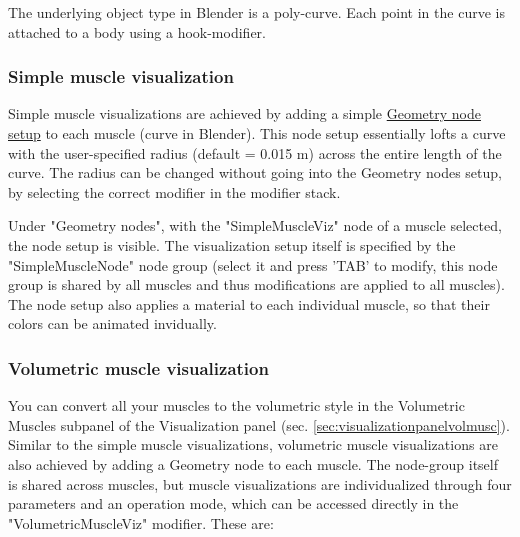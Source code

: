 \documentclass{article}
\begin{document}
The underlying object type in Blender is a poly-curve. Each point in the curve is attached to a body using a hook-modifier.

\subsubsection{Simple muscle visualization}
\label{sec:simplemuscleviz}

Simple muscle visualizations are achieved by adding a simple \href{https://docs.blender.org/manual/en/latest/modeling/geometry_nodes/index.html}{Geometry node setup} to each muscle (curve in Blender). This node setup essentially lofts a curve with the user-specified radius (default = 0.015 m) across the entire length of the curve. The radius can be changed without going into the Geometry nodes setup, by selecting the correct modifier in the modifier stack.

Under "Geometry nodes", with the "SimpleMuscleViz" node of a muscle selected, the node setup is visible. The visualization setup itself is specified by the "SimpleMuscleNode" node group (select it and press 'TAB' to modify, this node group is shared by all muscles and thus modifications are applied to all muscles). The node setup also applies a material to each individual muscle, so that their colors can be animated invidually.



\subsubsection{Volumetric muscle visualization}
\label{sec:volmuscleviz}

You can convert all your muscles to the volumetric style in the Volumetric Muscles subpanel of the Visualization panel (sec. \ref{sec:visualizationpanelvolmusc}). Similar to the simple muscle visualizations, volumetric muscle visualizations are also achieved by adding a Geometry node to each muscle. The node-group itself is shared across muscles, but muscle visualizations are individualized through four parameters and an operation mode, which can be accessed directly in the "VolumetricMuscleViz" modifier. These are:
\end{document}
